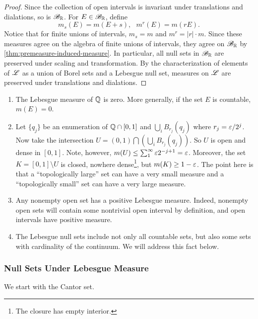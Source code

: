 \documentclass[12pt]{article} %
\begin{document}
\begin{proof}
    Since the collection of open intervals is invariant under translations and dialations, so is $\mathscr{B}_{\mathbb{R}}$. For $E \in \mathscr{B}_{\mathbb{R}}$, define \[m_s(E) = m(E + s), \ \ \ m^r(E) = m(rE).\] Notice that for finite unions of intervals, $m_s = m$ and $m^r = |r| \cdot m$. Since these measures agree on the algebra of finite unions of intervals, they agree on $\mathscr{B}_{\mathbb{R}}$ by \cref{thm:premeasure-induced-measure}. In particular, all null sets in $\mathscr{B}_{\mathbb{R}}$ are preserved under scaling and transformation. By the characterization of elements of $\mathscr{L}$ as a union of Borel sets and a Lebesgue null set, measures on $\mathscr{L}$ are preserved under translations and dialations.
\end{proof}

\begin{remark}
    \begin{enumerate}
        \item The Lebesgue measure of $\mathbb{Q}$ is zero. More generally, if the set $E$ is countable, $m(E) = 0$.
        \item Let $\{q_j\}$ be an enumeration of $\mathbb{Q} \cap [0,1]$ and $\bigcup_i B_{r_j}(q_j)$ where $r_j = \varepsilon / 2^j$. Now take the intersection $U = (0,1) \bigcap \left( \bigcup_i B_{r_j}(q_j) \right)$. So $U$ is open and dense in $[0,1]$. Note, however, $m(U) \leq \sum_1^\infty \varepsilon 2^{-j+1} = \varepsilon$. Moreover, the set $K = [0,1] \setminus U$ is closed, nowhere dense\footnote{The closure has empty interior.}, but $m(K) \geq 1 - \varepsilon$. The point here is that a ``topologically large'' set can have a very small measure and a ``topologically small'' set can have a very large measure.
        \item Any nonempty open set has a positive Lebesgue measure. Indeed, nonempty open sets will contain some nontrivial open interval by definition, and open intervals have positive measure.
        \item The Lebesgue null sets include not only all countable sets, but also some sets with cardinality of the continuum. We will address this fact below.
    \end{enumerate}
\end{remark}

\subsubsection{Null Sets Under Lebesgue Measure}

We start with the Cantor set.
\end{document}
